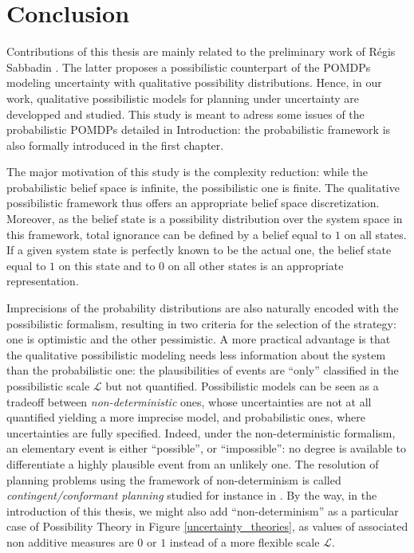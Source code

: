 \chapter*{Conclusion}
Contributions of this thesis are
mainly related to the preliminary work 
of R\'egis Sabbadin \cite{Sabbadin:1999:pipomdp}.
The latter proposes 
a possibilistic counterpart 
of the POMDPs 
modeling uncertainty 
with qualitative possibility distributions.
Hence, in our work, 
qualitative possibilistic models 
for planning under uncertainty
are developped and studied. 
This study is meant to adress some issues 
of the probabilistic POMDPs 
detailed in Introduction: 
the probabilistic framework is also 
formally introduced 
in the first chapter.

The major motivation of this study 
is the complexity reduction: 
while the probabilistic belief space is infinite,
the possibilistic one is finite.
The qualitative possibilistic framework 
thus offers an appropriate 
belief space discretization.
Moreover, as the belief state 
is a possibility distribution 
over the system space in this framework, 
total ignorance can be defined 
by a belief equal to $1$ on all states.
If a given system state is perfectly known
to be the actual one, 
the belief state equal to $1$ on this state 
and to $0$ on all other states 
is an appropriate representation.

Imprecisions of the probability distributions
are also naturally encoded 
with the possibilistic formalism, 
resulting in two criteria
for the selection of the strategy:
one is optimistic 
and the other pessimistic.
A more practical advantage is that 
the qualitative possibilistic modeling 
needs less information about the system
than the probabilistic one:
the plausibilities of events 
are ``only'' classified 
in the possibilistic scale $\mathcal{L}$ 
but not quantified.
Possibilistic models can be seen 
as a tradeoff between \textit{non-deterministic} ones, 
whose uncertainties are not at all quantified 
yielding a more imprecise model, 
and probabilistic ones, 
where uncertainties are fully specified.
Indeed, under the non-deterministic formalism,
an elementary event is either ``possible'',
or ``impossible'':
no degree is available
to differentiate a highly plausible event 
from an unlikely one.
The resolution of planning problems 
using the framework of non-determinism 
is called \textit{contingent/conformant planning} 
studied for instance in \cite{Albore_atranslation-based,bonet2014flexible}.
By the way, in the introduction of this thesis,
we might also add ``non-determinism''
as a particular case of Possibility Theory
in Figure \ref{uncertainty_theories},
as values of associated non additive measures
are $0$ or $1$ instead of a more flexible scale $\mathcal{L}$.

